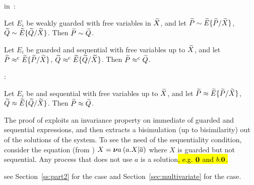  in~\citep[p.~103, 158]{Mil89}:
\begin{theorem}
\label{t:Mil89s1}
Let $E_i$ be weakly guarded with free variables in $\widetilde X$,
and let ${\widetilde P} \sim {\widetilde E}\{\widetilde P /\widetilde X\}$,
  ${\widetilde Q} \sim {\widetilde E}\{\widetilde Q /\widetilde X\}$. Then ${\widetilde P} \sim {\widetilde Q}$.
\end{theorem}

\begin{theorem}
\label{t:Mil89s3}
Let $E_i$ be guarded and sequential with free
variables up to $\widetilde X$, and let ${\widetilde P} \mathrel{\approx^{\rm{c}}} {\widetilde E}\{\widetilde P /\widetilde X\}$,
  ${\widetilde Q} \mathrel{\approx^{\rm{c}}} {\widetilde E}\{\widetilde Q /\widetilde X\}$. Then ${\widetilde P} \mathrel{\approx^{\rm{c}}} {\widetilde Q}$.
\end{theorem}

:
\begin{theorem}
\label{t:Mil89}
Let $E_i$ be   and sequential with free
variables up to $\widetilde X$, and let ${\widetilde P} \approx {\widetilde E}\{\widetilde P /\widetilde X\}$,
  ${\widetilde Q} \approx {\widetilde E}\{\widetilde Q /\widetilde X\}$. Then ${\widetilde P} \approx {\widetilde Q}$.
\end{theorem}


The proof of  exploits an invariance
property on immediate 
of guarded and sequential expressions, and then extracts a bisimulation
(up to bisimilarity) out
of the solutions of the system.
To see the need of the sequentiality  condition, consider
 the equation (from \cite{Mil89}) $X = {\boldsymbol \nu} a\: (a. X | \overline{a})$
where $X$ is guarded but not sequential. Any process that does not use
$a$ is a solution\hl{, e.g. ${\boldsymbol 0}$ and $b.{\boldsymbol 0}$.}

 see Section~\ref{ss:part2}
for the \univariate case and
Section~\ref{sec:multivariate} for the \multivariate case.

